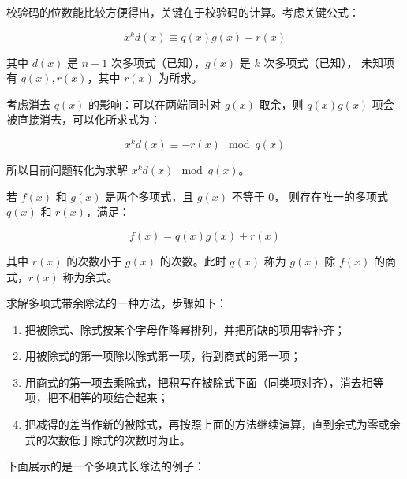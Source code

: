 校验码的位数能比较方便得出，关键在于校验码的计算。考虑关键公式：

\begin{equation*}
  x^kd(x)\equiv q(x)g(x)-r(x)
\end{equation*}

其中 $d(x)$ 是 $n-1$ 次多项式（已知），$g(x)$ 是 $k$ 次多项式（已知），
未知项有 $q(x),r(x)$，其中 $r(x)$ 为所求。

考虑消去 $q(x)$ 的影响：可以在两端同时对 $g(x)$ 取余，则 $q(x)g(x)$ 项会被直接消去，可以化所求式为：

\begin{equation*}
  x^kd(x)\equiv -r(x) \mod q(x)
\end{equation*}

所以目前问题转化为求解 $x^kd(x) \mod q(x)$。

\begin{definition}[多项式带余除法] \label{def:polynomial_division}
  若 $f(x)$ 和 $g(x)$ 是两个多项式，且 $g(x)$ 不等于 $0$，
  则存在唯一的多项式 $q(x)$ 和 $r(x)$，满足：

  \begin{equation*}
    f(x)=q(x)g(x)+r(x)
  \end{equation*}

  其中 $r(x)$ 的次数小于 $g(x)$ 的次数。此时 $q(x)$ 称为 $g(x)$ 除 $f(x)$ 的商式，$r(x)$ 称为余式。
\end{definition}

\begin{definition}[多项式长除法] \label{def:polynomial_division_method}
  求解多项式带余除法的一种方法，步骤如下：

  \begin{enumerate}
    \item 把被除式、除式按某个字母作降幂排列，并把所缺的项用零补齐；
    \item 用被除式的第一项除以除式第一项，得到商式的第一项；
    \item 用商式的第一项去乘除式，把积写在被除式下面（同类项对齐），消去相等项，把不相等的项结合起来；
    \item 把减得的差当作新的被除式，再按照上面的方法继续演算，直到余式为零或余式的次数低于除式的次数时为止。
  \end{enumerate}

\end{definition}

下面展示的是一个多项式长除法的例子：


